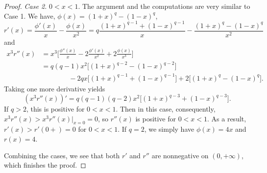 \documentclass[10pt]{article}
\newcommand{\1}{\textbf{1}}
\newtheorem{lemma}[theorem]{Lemma}
\theoremstyle{remark}
\theoremstyle{definition}
\begin{document}
\begin{proof}
\bigskip
\noindent
\emph{Case 2.} $0 < x < 1$. The argument and the computations are very similar to Case 1. We have, $\phi(x) = (1+x)^q - (1-x)^q$,
\[
r'(x) = \frac{\phi'(x)}{x} - \frac{\phi(x)}{x^2} = q\frac{(1+x)^{q-1}+(1-x)^{q-1}}{x} - \frac{(1+x)^q-(1-x)^q}{x^2}
\]
and
\begin{align*}
x^3r''(x) &= x^3\Bigg[\frac{\phi''(x)}{x}-2\frac{\phi'(x)}{x^2}+2\frac{\phi(x)}{x^3}\Bigg] \\
&=q(q-1)x^2\Big[(1+x)^{q-2}-(1-x)^{q-2}\Big] \\
&\qquad\qquad-2qx\Big[(1+x)^{q-1}+(1-x)^{q-1}\Big]+ 2\Big[(1+x)^q-(1-x)^q\Big].
\end{align*}
Taking one more derivative yields
\[
(x^3r''(x))' = q(q-1)(q-2)x^2\Big[(1+x)^{q-3}+(1-x)^{q-3}\Big].
\]
If $q > 2$, this is positive for $0 < x  < 1$. Then in this case, consequently, $x^3r''(x) > x^3r''(x)\Big|_{x=0} = 0$, so $r''(x)$ is positive for $0 < x < 1$. As a result, $r'(x) > r'(0+) = 0$ for $0 < x < 1$. If $q = 2$, we simply have $\phi(x) = 4x$ and $r(x) = 4$. 

Combining the cases, we see that both $r'$ and $r''$ are nonnegative on $(0,+\infty)$, which finishes the proof.
\end{proof}

\end{document}
